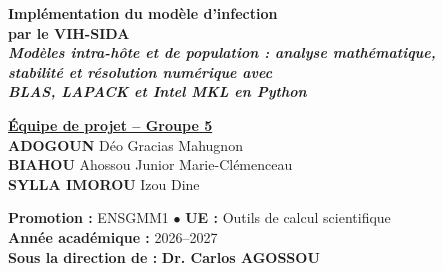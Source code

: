 \documentclass[11pt,a4paper]{report}
\theoremstyle{plain}
\theoremstyle{definition}
\theoremstyle{remark}
\begin{document}
\begin{titlepage}
    \begin{tcolorbox}[colback=navyblue!5!white, colframe=navyblue, arc=4pt,
        boxrule=1.2pt, width=0.95\textwidth, halign=center]
        \vspace{0.3cm}
        {\fontsize{20}{24}\selectfont \textbf{\textcolor{navyblue}{Implémentation du modèle d'infection}}}\\[0.2cm]
        {\fontsize{22}{26}\selectfont \textbf{\textcolor{accentred}{par le VIH-SIDA}}}\\[0.35cm]
        {\fontsize{11}{14}\selectfont \textbf{\textit{Modèles intra-hôte et de population : analyse mathématique,}}}\\[0.1cm]
        {\fontsize{11}{14}\selectfont \textbf{\textit{stabilité et résolution numérique avec}}}\\[0.1cm]
        {\fontsize{11}{14}\selectfont \textbf{\textit{BLAS, LAPACK et Intel MKL en Python}}}
        \vspace{0.3cm}
    \end{tcolorbox}

    \vspace{0.6cm}

    {\fontsize{13}{16}\selectfont \textbf{\textcolor{navyblue}{\underline{Équipe de projet -- Groupe 5}}}}\\[0.35cm]
    {\large \textbf{ADOGOUN}} Déo Gracias Mahugnon\\[0.15cm]
    {\large \textbf{BIAHOU}} Ahossou Junior Marie-Clémenceau\\[0.15cm]
    {\large \textbf{SYLLA IMOROU}} Izou Dine

    \vfill

    \begin{tcolorbox}[colback=lightbg, colframe=gray!40, boxrule=0.5pt, arc=2pt, width=0.92\textwidth]
        \centering
        \small
        \textbf{Promotion :} ENSGMM1 \quad $\bullet$ \quad \textbf{UE :} Outils de calcul scientifique\\[0.1cm]
        \textbf{Année académique :} 2026--2027\\[0.15cm]
        \textbf{Sous la direction de :} \textbf{\textcolor{navyblue}{Dr. Carlos AGOSSOU}}
    \end{tcolorbox}
    \vspace*{-0.2cm}
\end{titlepage}

\newpage
{}   %
\tableofcontents
\newpage
\end{document}
